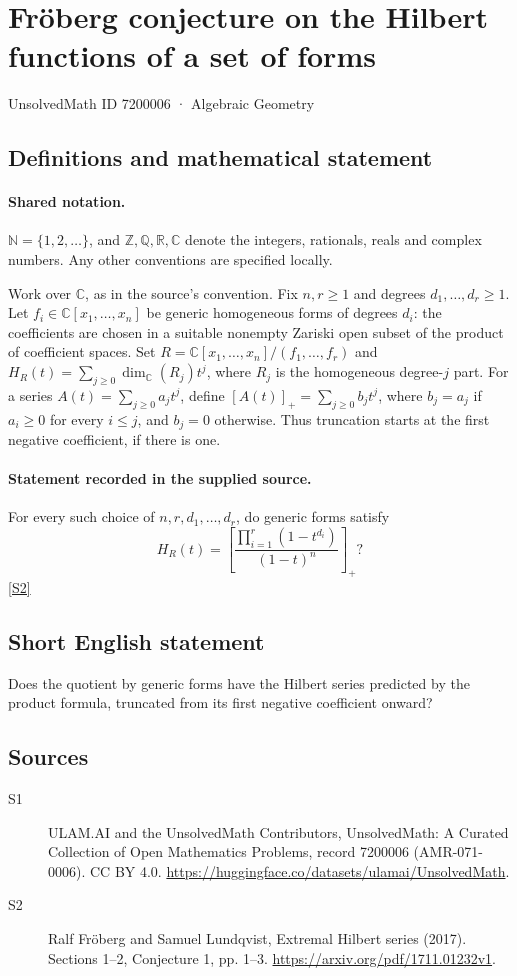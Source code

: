 \documentclass[11pt]{article}
\newcommand{\sref}[2]{\hyperlink{source:#1:#2}{[S#2]}}
\begin{document}
\setcounter{section}{7200005}
\section{Fröberg conjecture on the Hilbert functions of a set of forms}\label{7200006}
{\small\sffamily UnsolvedMath ID 7200006 · Algebraic Geometry}
\subsection{Definitions and mathematical statement}

\paragraph{Shared notation.}$\mathbb N=\{1,2,\ldots\}$, and $\mathbb Z,\mathbb Q,\mathbb R,\mathbb C$ denote the integers, rationals, reals and complex numbers. Any other conventions are specified locally.


Work over $\mathbb C$, as in the source's convention. Fix $n,r\geq1$ and degrees $d_1,\ldots,d_r\geq1$. Let $f_i\in\mathbb C[x_1,\ldots,x_n]$ be generic homogeneous forms of degrees $d_i$: the coefficients are chosen in a suitable nonempty Zariski open subset of the product of coefficient spaces. Set $R=\mathbb C[x_1,\ldots,x_n]/(f_1,\ldots,f_r)$ and $H_R(t)=\sum_{j\geq0}\dim_{\mathbb C}(R_j)t^j$, where $R_j$ is the homogeneous degree-$j$ part. For a series $A(t)=\sum_{j\geq0}a_jt^j$, define $[A(t)]_+=\sum_{j\geq0}b_jt^j$, where $b_j=a_j$ if $a_i\geq0$ for every $i\leq j$, and $b_j=0$ otherwise. Thus truncation starts at the first negative coefficient, if there is one.
\paragraph{Statement recorded in the supplied source.}
For every such choice of $n,r,d_1,\ldots,d_r$, do generic forms satisfy
\[H_R(t)=\left[\frac{\prod_{i=1}^r(1-t^{d_i})}{(1-t)^n}\right]_+?\] \sref{7200006}{2}
\subsection{Short English statement}
Does the quotient by generic forms have the Hilbert series predicted by the product formula, truncated from its first negative coefficient onward?
\subsection{Sources}
\begin{description}
\item[\hypertarget{source:7200006:1}{S1}] ULAM.AI and the UnsolvedMath Contributors, UnsolvedMath: A Curated Collection of Open Mathematics Problems, record 7200006 (AMR-071-0006). CC BY 4.0. \url{https://huggingface.co/datasets/ulamai/UnsolvedMath}.
\item[\hypertarget{source:7200006:2}{S2}] Ralf Fröberg and Samuel Lundqvist, Extremal Hilbert series (2017). Sections 1–2, Conjecture 1, pp. 1–3. \url{https://arxiv.org/pdf/1711.01232v1}.
\end{description}
\label{end:7200006}
\end{document}
